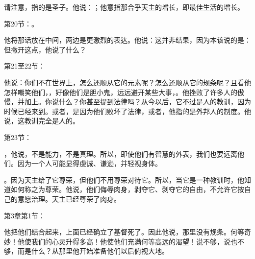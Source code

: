 请注意，指的是圣子。他说：；他意指那合乎天主的增长，即最佳生活的增长。\par

第20节：。\par

他将那话放在中间，两边是更激烈的表达。他说：这并非结果，因为本该说的是：但撇开这点，他说了什么？\par

第21至22节：\par

他说：你们不在世界上，怎么还顺从它的元素呢？怎么还顺从它的规条呢？且看他怎样嘲笑他们，，好像他们是胆小鬼，远远避开某些大事，。他挫败了许多人的傲慢，并加上。你说什么？你甚至提到法律吗？从今以后，它不过是人的教训，因为时候已经来到。或者，是因为他们败坏了法律，或者，他指的是外邦人的制度。他说，这教训完全是人的。\par

第23节：\par

，他说，不是能力，不是真理。所以，即使他们有智慧的外表，我们也要远离他们。因为一个人可能显得虔诚、谦逊，并轻视身体。\par

。因为天主给了它尊荣，但他们不用尊荣对待它。所以，当它是一种教训时，他知道如何称之为尊荣。他说，他们侮辱肉身，剥夺它、剥夺它的自由，不允许它按自己的意愿治理。天主已经尊荣了肉身。\par

第3章第1节：\par

他把他们结合起来，上面已经确立了基督死了。因此他说，那里没有规条。何等奇妙！他使我们的心灵升得多高！他使他们充满何等高远的渴望！说不够，说也不够，而是什么？从那里他开始准备他们以后俯视大地。\par

